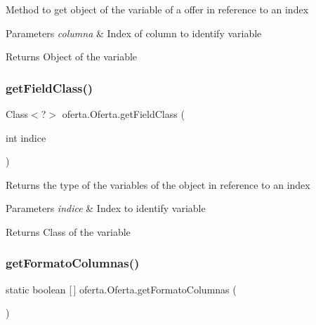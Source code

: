 Method to get object of the variable of a offer in reference to an index


\begin{DoxyParams}{Parameters}
{\em columna} & Index of column to identify variable \\
\hline
\end{DoxyParams}
\begin{DoxyReturn}{Returns}
Object of the variable 
\end{DoxyReturn}
\mbox{\label{classoferta_1_1_oferta_ad86745793087dca9bce627f40db9e3db}} 
\subsubsection{\texorpdfstring{get\+Field\+Class()}{getFieldClass()}}
{\footnotesize\ttfamily Class$<$?$>$ oferta.\+Oferta.\+get\+Field\+Class (\begin{DoxyParamCaption}\item[{int}]{indice }\end{DoxyParamCaption})}

Returns the type of the variables of the object in reference to an index


\begin{DoxyParams}{Parameters}
{\em indice} & Index to identify variable \\
\hline
\end{DoxyParams}
\begin{DoxyReturn}{Returns}
Class of the variable 
\end{DoxyReturn}
\mbox{\label{classoferta_1_1_oferta_aa069a89096c9621c3cc1b17b72b09d27}} 
\subsubsection{\texorpdfstring{get\+Formato\+Columnas()}{getFormatoColumnas()}}
{\footnotesize\ttfamily static boolean \mbox{[}$\,$\mbox{]} oferta.\+Oferta.\+get\+Formato\+Columnas (\begin{DoxyParamCaption}{ }\end{DoxyParamCaption})\hspace{0.3cm}{\ttfamily [static]}}

